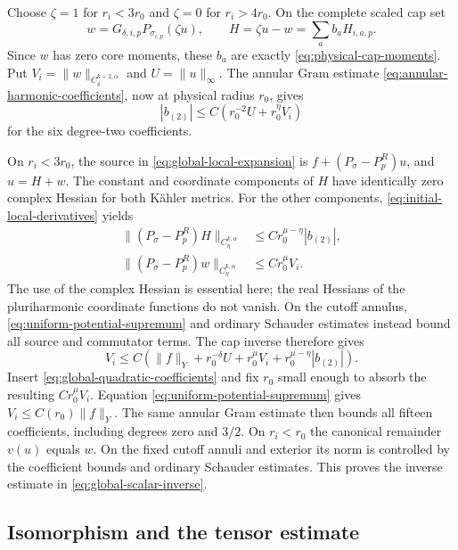 Choose $\zeta=1$ for $r_i<3r_0$ and $\zeta=0$
for $r_i>4r_0$. On the complete scaled cap set
\begin{equation}\label{eq:global-local-expansion}
 w=G_{\delta,i,p}P_{\sigma_{i,p}}(\zeta u),
 \qquad
 H=\zeta u-w=\sum_ab_aH_{i,a,p}.
\end{equation}
Since $w$ has zero core moments, these $b_a$
are exactly \eqref{eq:physical-cap-moments}.
Put $V_i=\|w\|_{C^{k+2,\alpha}_\delta}$ and
$U=\|u\|_\infty$. The annular Gram estimate
\eqref{eq:annular-harmonic-coefficients}, now at
physical radius $r_0$, gives
\begin{equation}\label{eq:global-quadratic-coefficients}
 |b_{(2)}|\le C(r_0^{-2}U+r_0^\eta V_i)
\end{equation}
for the six degree-two coefficients.

On $r_i<3r_0$, the source in
\eqref{eq:global-local-expansion} is
$f+(P_\sigma-P_p^R)u$, and $u=H+w$.
The constant and coordinate components of $H$
have identically zero complex Hessian for both
Kähler metrics. For the other components,
\eqref{eq:initial-local-derivatives} yields
\[
 \begin{split}
 \|(P_\sigma-P_p^R)H\|_{C^{k,\alpha}_\eta}
       &\le Cr_0^{\mu-\eta}|b_{(2)}|,\\
 \|(P_\sigma-P_p^R)w\|_{C^{k,\alpha}_\eta}
       &\le Cr_0^\mu V_i.
 \end{split}
\]
The use of the complex Hessian is essential here;
the real Hessians of the pluriharmonic coordinate
functions do not vanish. On the cutoff annulus,
\eqref{eq:uniform-potential-supremum} and ordinary
Schauder estimates instead bound all source and
commutator terms. The cap inverse therefore gives
\[
 V_i\le C\left(\|f\|_Y+r_0^{-\delta}U
             +r_0^\mu V_i+r_0^{\mu-\eta}|b_{(2)}|\right).
\]
Insert \eqref{eq:global-quadratic-coefficients}
and fix $r_0$ small enough to absorb the resulting
$Cr_0^\mu V_i$. Equation
\eqref{eq:uniform-potential-supremum} gives
$V_i\le C(r_0)\|f\|_Y$. The same annular Gram
estimate then bounds all fifteen coefficients,
including degrees zero and $3/2$. On $r_i<r_0$
the canonical remainder $v(u)$ equals $w$.
On the fixed cutoff annuli and exterior its
norm is controlled by the coefficient bounds
and ordinary Schauder estimates. This proves
the inverse estimate in
\eqref{eq:global-scalar-inverse}.

\subsection{Isomorphism and the tensor estimate}

